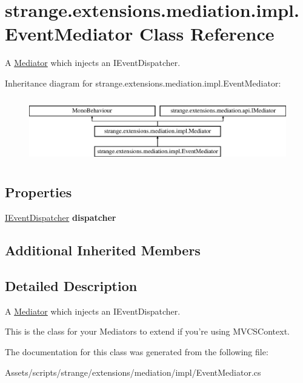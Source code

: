 \hypertarget{classstrange_1_1extensions_1_1mediation_1_1impl_1_1_event_mediator}{\section{strange.\-extensions.\-mediation.\-impl.\-Event\-Mediator Class Reference}
\label{classstrange_1_1extensions_1_1mediation_1_1impl_1_1_event_mediator}
}


A \hyperlink{classstrange_1_1extensions_1_1mediation_1_1impl_1_1_mediator}{Mediator} which injects an I\-Event\-Dispatcher.  


Inheritance diagram for strange.\-extensions.\-mediation.\-impl.\-Event\-Mediator\-:\begin{figure}[H]
\begin{center}
\leavevmode
\includegraphics[height=2.857143cm]{classstrange_1_1extensions_1_1mediation_1_1impl_1_1_event_mediator}
\end{center}
\end{figure}
\subsection*{Properties}
\begin{DoxyCompactItemize}
\item 
\hypertarget{classstrange_1_1extensions_1_1mediation_1_1impl_1_1_event_mediator_ab3d98daf5cff6502fd9430020181ff7e}{\hyperlink{interfacestrange_1_1extensions_1_1dispatcher_1_1eventdispatcher_1_1api_1_1_i_event_dispatcher}{I\-Event\-Dispatcher} {\bfseries dispatcher}}\label{classstrange_1_1extensions_1_1mediation_1_1impl_1_1_event_mediator_ab3d98daf5cff6502fd9430020181ff7e}

\end{DoxyCompactItemize}
\subsection*{Additional Inherited Members}


\subsection{Detailed Description}
A \hyperlink{classstrange_1_1extensions_1_1mediation_1_1impl_1_1_mediator}{Mediator} which injects an I\-Event\-Dispatcher. 

This is the class for your Mediators to extend if you're using M\-V\-C\-S\-Context. 

The documentation for this class was generated from the following file\-:\begin{DoxyCompactItemize}
\item 
Assets/scripts/strange/extensions/mediation/impl/Event\-Mediator.\-cs\end{DoxyCompactItemize}
